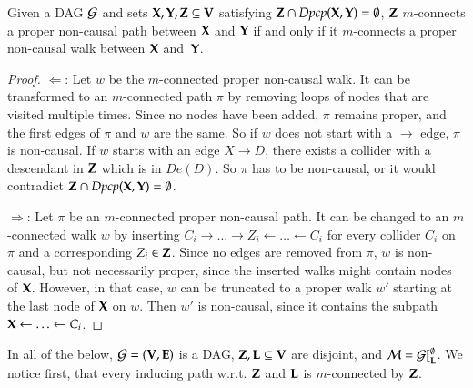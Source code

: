 \begin{lemma}
Given a DAG ${\cal G}$ and sets ${\bf X}, {\bf Y}, {\bf Z}\subseteq {\bf V}$ satisfying
${\bf Z}\cap\textit{Dpcp}({\bf X},{\bf Y})=\emptyset$, ${\bf Z}$ $m$-connects 
a proper non-causal path
between ${\bf X}$ and ${\bf Y}$ if and
only if it $m$-connects a proper non-causal
walk between ${\bf X}$ and~${\bf Y}$.
\label{lemma:auxiliary:walkpathconversion}
\end{lemma}
\begin{proof}
$\Leftarrow$: Let $w$ be the $m$-connected proper non-causal walk. 
It can be transformed to an $m$-connected path $\pi$ by removing loops of nodes
that are visited multiple times. Since no nodes have been added,
$\pi$ remains proper, and the first edges of $\pi$ and $w$ are the same.
So if $w$ does not start with a $\to$ edge, $\pi$ is non-causal. If $w$ starts
with an edge $X \to D$, there exists a collider with a descendant in ${\bf Z}$ 
which is in $\textit{De}(D)$. So $\pi$ has to be non-causal, or it
would contradict ${\bf Z}\cap\textit{Dpcp}({\bf X},{\bf Y})=\emptyset$.

$\Rightarrow$: Let $\pi$ be an $m$-connected proper non-causal path. It can be
changed to an $m$-connected walk $w$ by inserting 
$C_i \to \ldots \to Z_i \gets \ldots \gets C_i$ for every collider $C_i$ on 
$\pi$ and a corresponding $Z_i \in {\bf Z}$. 
Since no edges are removed from $\pi$,
$w$ is non-causal, but not necessarily proper, since the 
inserted walks might contain 
nodes of ${\bf X}$. However, in that case, $w$ can be truncated to a proper walk 
$w'$ starting at the last node of ${\bf X}$ on $w$. Then $w'$ is non-causal, since 
it contains the subpath ${\bf X} \gets \ldots \gets C_i$.
\end{proof}

In all of the below, ${\cal G}=({\bf V},{\bf E})$ is a DAG,
${\bf Z},{\bf L} \subseteq {\bf V}$ are disjoint, 
and ${\cal M}={\cal G}[^\emptyset_{\bf L}$.
%
We notice first, that every inducing path w.r.t.
${\bf Z}$ and ${\bf L}$ is $m$-connected by 
${\bf Z}$.

% 
% 

